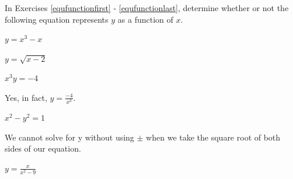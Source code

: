 \documentclass{ximera}
\begin{document}
\begin{question}
In Exercises \ref{equfunctionfirst} - \ref{equfunctionlast}, determine whether or not the following equation represents $y$ as a function of $x$.

\begin{problem}\label{equfunctionfirst}
$y = x^{3} - x$

\begin{multipleChoice}
\end{multipleChoice}

\end{problem}

\begin{problem}
$y = \sqrt{x - 2}$

\begin{multipleChoice}
\end{multipleChoice}
\end{problem}

\begin{problem}
$x^{3}y = -4$ 

\begin{multipleChoice}
    \begin{feedback}
        Yes, in fact, $y=\frac{-4}{x^3}$.
    \end{feedback}
\end{multipleChoice}
\end{problem}

\begin{problem}
$x^{2} - y^{2} = 1$ 

\begin{multipleChoice}
    \begin{feedback}
        We cannot solve for y without using $\pm$ when we take the square root of both sides of our equation.
    \end{feedback}
\end{multipleChoice}
\end{problem}


\begin{problem}
$y = \frac{x}{x^{2} - 9}$ 

\begin{multipleChoice}
\end{multipleChoice}
\end{problem}



\end{question}
\end{document}
